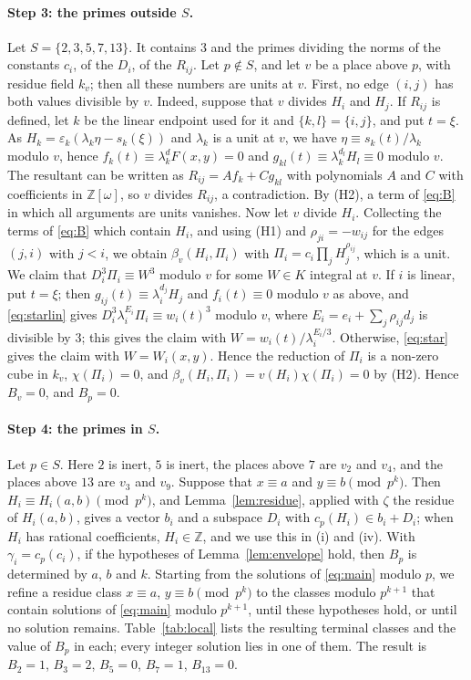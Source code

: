 \documentclass[11pt]{article}
\newcommand{\Z}{\mathbb{Z}}
\begin{document}
\paragraph{Step 3: the primes outside $S$.} Let $S=\{2,3,5,7,13\}$. It contains $3$ and the primes dividing the norms of the constants $c_i$, of the $D_i$, of the $R_{ij}$. Let $p\notin S$, and let $v$ be a place above $p$, with residue field $k_v$; then all these numbers are units at $v$. First, no edge $(i,j)$ has both values divisible by $v$. Indeed, suppose that $v$ divides $H_i$ and $H_j$. If $R_{ij}$ is defined, let $k$ be the linear endpoint used for it and $\{k,l\}=\{i,j\}$, and put $t=\xi$. As $H_k=\varepsilon_k(\lambda_k\eta-s_k(\xi))$ and $\lambda_k$ is a unit at $v$, we have $\eta\equiv s_k(t)/\lambda_k$ modulo $v$, hence $f_k(t)\equiv\lambda_k^dF(x,y)=0$ and $g_{kl}(t)\equiv\lambda_k^{d_l}H_l\equiv0$ modulo $v$. The resultant can be written as $R_{ij}=Af_k+Cg_{kl}$ with polynomials $A$ and $C$ with coefficients in $\Z[\omega]$, so $v$ divides $R_{ij}$, a contradiction. By (H2), a term of \eqref{eq:B} in which all arguments are units vanishes. Now let $v$ divide $H_i$. Collecting the terms of \eqref{eq:B} which contain $H_i$, and using (H1) and $\rho_{ji}=-w_{ij}$ for the edges $(j,i)$ with $j<i$, we obtain $\beta_v(H_i,\Pi_i)$ with $\Pi_i=c_i\prod_jH_j^{\rho_{ij}}$, which is a unit. We claim that $D_i^3\Pi_i\equiv W^3$ modulo $v$ for some $W\in K$ integral at $v$. If $i$ is linear, put $t=\xi$; then $g_{ij}(t)\equiv\lambda_i^{d_j}H_j$ and $f_i(t)\equiv0$ modulo $v$ as above, and \eqref{eq:starlin} gives $D_i^3\lambda_i^{E_i}\Pi_i\equiv w_i(t)^3$ modulo $v$, where $E_i=e_i+\sum_j\rho_{ij}d_j$ is divisible by $3$; this gives the claim with $W=w_i(t)/\lambda_i^{E_i/3}$. Otherwise, \eqref{eq:star} gives the claim with $W=W_i(x,y)$. Hence the reduction of $\Pi_i$ is a non-zero cube in $k_v$, $\chi(\Pi_i)=0$, and $\beta_v(H_i,\Pi_i)=v(H_i)\chi(\Pi_i)=0$ by (H2). Hence $B_v=0$, and $B_p=0$.

\paragraph{Step 4: the primes in $S$.} Let $p\in S$. Here $2$ is inert, $5$ is inert, the places above $7$ are $v_{2}$ and $v_{4}$, and the places above $13$ are $v_{3}$ and $v_{9}$. Suppose that $x\equiv a$ and $y\equiv b\pmod{p^k}$. Then $H_i\equiv H_i(a,b)\pmod{p^k}$, and Lemma~\ref{lem:residue}, applied with $\zeta$ the residue of $H_i(a,b)$, gives a vector $b_i$ and a subspace $D_i$ with $c_p(H_i)\in b_i+D_i$; when $H_i$ has rational coefficients, $H_i\in\Z$, and we use this in (i) and (iv). With $\gamma_i=c_p(c_i)$, if the hypotheses of Lemma~\ref{lem:envelope} hold, then $B_p$ is determined by $a$, $b$ and $k$. Starting from the solutions of \eqref{eq:main} modulo $p$, we refine a residue class $x\equiv a$, $y\equiv b\pmod{p^k}$ to the classes modulo $p^{k+1}$ that contain solutions of \eqref{eq:main} modulo $p^{k+1}$, until these hypotheses hold, or until no solution remains. Table~\ref{tab:local} lists the resulting terminal classes and the value of $B_p$ in each; every integer solution lies in one of them. The result is $B_{2}=1$, $B_{3}=2$, $B_{5}=0$, $B_{7}=1$, $B_{13}=0$.
\end{document}
